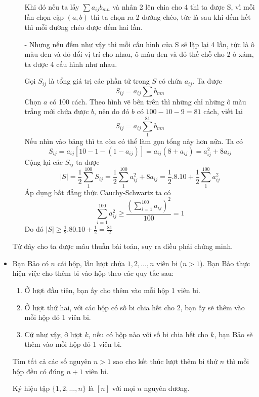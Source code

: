 \documentclass[11pt]{scrartcl}
\begin{document}
\begin{itemize}[label=, leftmargin=0em, itemsep=0.5em]
\begin{sol}
\begin{itemize}[label=,leftmargin=0em]
        Khi đó nếu ta lấy $\sum a_{ij}b_{mn}$ và nhân 2 lên chia cho 4 thì ta được S, vì mỗi lần chọn cặp $(a,b)$ thì ta chọn ra 2 đường chéo, tức là sau khi đếm hết thì mỗi đường chéo được đếm hai lần. 
    
        - Nhưng nếu đếm như vậy thì mỗi cấu hình của S sẽ lặp lại 4 lần, tức là ô màu đen và đỏ đổi vị trí cho nhau, ô màu đen và đỏ thế chỗ cho 2 ô xám, ta được 4 cấu hình như nhau.
    
        Gọi $S_{ij}$ là tổng giá trị các phần tử trong $S$ có chứa $a_{ij}$. Ta được $$S_{ij} = a_{ij} \sum b_{mn}$$
        Chọn $a$ có 100 cách. Theo hình vẽ bên trên thì những chỉ những ô màu trắng mới chứa được $b$, nên do đó $b$ có $100 - 10 - 9 = 81$ cách, viết lại 
        $$ S_{ij} = a_{ij}\sum_{1}^{81} b_{mn}
        $$
        Nếu nhìn vào bảng thì ta còn có thể làm gọn tổng này hơn nữa. Ta có
        $$ S_{ij} = a_{ij}[10 - 1 - (1 - a_{ij}) ]
        = a_{ij}(8 + a_{ij})
        = a_{ij}^2 + 8a_{ij}
        $$
        Cộng lại các $S_{ij}$ ta được
        $$ |S| = \frac{1}{2}\sum_{1}^{100} S_{ij} =\frac{1}{2} \sum_{1}^{100} a_{ij}^2 + 8a_{ij} =  \frac{1}{2}.8.10 + \frac{1}{2}\sum_{1}^{100} a_{ij}^2  
        $$
        Áp dụng bất đẳng thức Cauchy-Schwartz ta có 
        $$ \sum_{i=1}^{100} a_{ij}^2 \geq \frac{ \left(\displaystyle \sum_{i=1}^{100}a_{ij}\right)^2}{100} = 1
        $$
        Do đó $|S| \geq \frac{1}{2}.80.10 + \frac{1}{2} = \frac{81}{2}$
    \end{itemize}
    Từ đây cho ta được mâu thuẫn bài toán, suy ra điều phải chứng minh.
    \end{sol}

    \item \begin{bt}
        Bạn Bảo có $n$ cái hộp, lần lượt chứa $1,2,\dots,n$ viên bi ($n > 1$). Bạn Bảo thực hiện việc cho thêm bi vào hộp theo các quy tắc sau:
        \begin{enumerate}
            \item Ở lượt đầu tiên, bạn ấy cho thêm vào mỗi hộp 1 viên bi.
            \item Ở lượt thứ hai, với các hộp có số bi chia hết cho $2$, bạn ấy sẽ thêm vào mỗi hộp đó 1 viên bi.
            \item Cứ như vậy, ở lượt $k$, nếu có hộp nào với số bi chia hết cho $k$, bạn Bảo sẽ thêm vào mỗi hộp đó 1 viên bi.
        \end{enumerate}
        Tìm tất cả các số nguyên $n > 1$ sao cho kết thúc lượt thêm bi thứ $n$ thì mỗi hộp đều có đúng $n + 1$ viên bi.
    \end{bt}
    \begin{sol}
         Ký hiệu tập $\{1,2,\dots, n\}$ là $[n]$ với mọi $n$ nguyên dương.


\end{sol}
\end{itemize}
\end{document}
